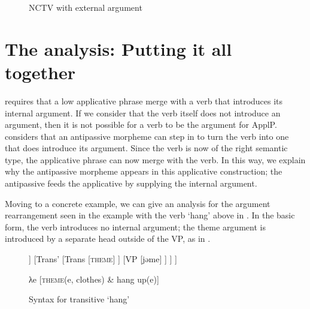 \documentclass[output=paper,colorlinks,citecolor=brown,modfonts,nonflat]{langsci/langscibook}
\begin{document}
\begin{figure}
	\caption{\label{fig:basilico:7} NCTV with external argument}
 \end{figure}

\section{The analysis: Putting it all together} %

\citet{Pyllkänen2008} requires that a low applicative phrase merge with a verb that introduces its internal argument. If we consider that the verb itself does not introduce an argument, then it is not possible for a verb to be the argument for ApplP. \citet{Basilico2017} considers that an antipassive morpheme can step in to turn the verb into one that does introduce its argument. Since the verb is now of the right semantic type, the applicative phrase can now merge with the verb. In this way, we explain why the antipassive morpheme appears in this applicative construction; the antipassive feeds the applicative by supplying the internal argument.

Moving to a concrete example, we can give an analysis for the argument rearrangement seen in the example with the verb ‘hang’ above in . In the basic form, the verb introduces no internal argument; the theme argument is introduced by a separate head outside of the VP, as in .

\begin{figure}
	\begin{forest}
			[TransP
				[NP
					[ewirɁ-ǝ-t]
				]
				[Trans'
					[Trans
						[\textsc{theme}]
					]
					[VP
						[jǝme]
					]
				]
			]
	\end{forest}

λe [\textsc{theme}(e, clothes) \& hang up(e)]
	\caption{\label{fig:basilico:8} Syntax for transitive ‘hang’}
\end{figure}
\end{document}
